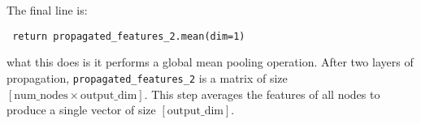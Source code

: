 \documentclass{article}
\begin{document}
The final line is: \begin{verbatim} return propagated_features_2.mean(dim=1) \end{verbatim} what this does is it performs a global mean pooling operation. After two layers of propagation, \texttt{propagated\_features\_2} is a matrix of size $[\text{num\_nodes} \times \text{output\_dim}]$. This step averages the features of all nodes to produce a single vector of size $[\text{output\_dim}]$.
\end{document}
